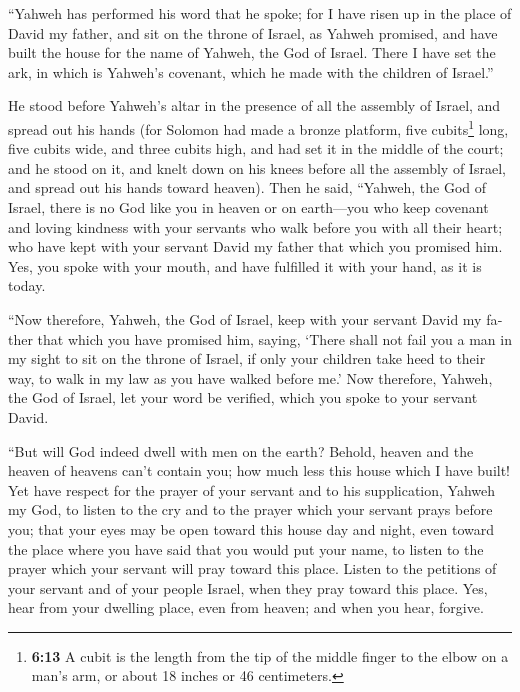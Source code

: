 \begin{paracol}{2}
\begin{otherlanguage}{english}
 ``Yahweh has performed his word that he spoke; for I
have risen up in the place of David my father, and sit on the throne of
Israel, as Yahweh promised, and have built the house for the name of
Yahweh, the God of Israel.  There I have set the ark, in
which is Yahweh's covenant, which he made with the children of Israel.''

 He stood before Yahweh's altar in the presence of all
the assembly of Israel, and spread out his hands  (for
Solomon had made a bronze platform, five cubits\footnote{\textbf{6:13} A
  cubit is the length from the tip of the middle finger to the elbow on
  a man's arm, or about 18 inches or 46 centimeters.} long, five cubits
wide, and three cubits high, and had set it in the middle of the court;
and he stood on it, and knelt down on his knees before all the assembly
of Israel, and spread out his hands toward heaven).  Then
he said, ``Yahweh, the God of Israel, there is no God like you in heaven
or on earth---you who keep covenant and loving kindness with your
servants who walk before you with all their heart;  who
have kept with your servant David my father that which you promised him.
Yes, you spoke with your mouth, and have fulfilled it with your hand, as
it is today.

 ``Now therefore, Yahweh, the God of Israel, keep with
your servant David my father that which you have promised him, saying,
`There shall not fail you a man in my sight to sit on the throne of
Israel, if only your children take heed to their way, to walk in my law
as you have walked before me.'  Now therefore, Yahweh,
the God of Israel, let your word be verified, which you spoke to your
servant David.

 ``But will God indeed dwell with men on the earth?
Behold, heaven and the heaven of heavens can't contain you; how much
less this house which I have built!  Yet have respect for
the prayer of your servant and to his supplication, Yahweh my God, to
listen to the cry and to the prayer which your servant prays before you;
 that your eyes may be open toward this house day and
night, even toward the place where you have said that you would put your
name, to listen to the prayer which your servant will pray toward this
place.  Listen to the petitions of your servant and of
your people Israel, when they pray toward this place. Yes, hear from
your dwelling place, even from heaven; and when you hear, forgive.


\end{otherlanguage}
\end{paracol}
